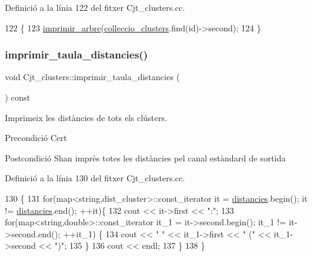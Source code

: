 Definició a la línia 122 del fitxer Cjt\+\_\+clusters.\+cc.


\begin{DoxyCode}
122                                                           \{
123     \hyperlink{_cjt__clusters_8cc_ac7539e7b223cc6042be093b32ac8b016}{imprimir\_arbre}(\hyperlink{class_cjt__clusters_aea7d6362517dd16cbd12736a3da50021}{colleccio\_clusters}.find(\textcolor{keywordtype}{id})->second);
124 \}
\end{DoxyCode}
\mbox{\label{class_cjt__clusters_a2ee45d5dabc656adf8d7d356239f57c6}} 
\subsubsection{\texorpdfstring{imprimir\+\_\+taula\+\_\+distancies()}{imprimir\_taula\_distancies()}}
{\footnotesize\ttfamily void Cjt\+\_\+clusters\+::imprimir\+\_\+taula\+\_\+distancies (\begin{DoxyParamCaption}{ }\end{DoxyParamCaption}) const}



Imprimeix les distàncies de tots els clústers. 

\begin{DoxyPrecond}{Precondició}
Cert 
\end{DoxyPrecond}
\begin{DoxyPostcond}{Postcondició}
S\textquotesingle{}han imprès totes les distàncies pel canal estàndard de sortida 
\end{DoxyPostcond}


Definició a la línia 130 del fitxer Cjt\+\_\+clusters.\+cc.


\begin{DoxyCode}
130                                                   \{
131     \textcolor{keywordflow}{for}(map<string,dist\_cluster>::const\_iterator it = \hyperlink{class_cjt__clusters_a8e94e53830e3224d791dcf7dbd0a6082}{distancies}.begin(); it != 
      \hyperlink{class_cjt__clusters_a8e94e53830e3224d791dcf7dbd0a6082}{distancies}.end(); ++it)\{
132         cout << it->first << \textcolor{stringliteral}{":"};
133         \textcolor{keywordflow}{for}(map<string,double>::const\_iterator it\_1 = it->second.begin(); it\_1 != it->second.end(); ++it\_1)
      \{
134             cout << \textcolor{stringliteral}{" "} << it\_1->first << \textcolor{stringliteral}{" ("} << it\_1->second << \textcolor{stringliteral}{")"};
135         \}
136         cout << endl;
137     \}
138 \}
\end{DoxyCode}
\mbox{\label{class_cjt__clusters_af85ce29152ee18987f391a2d27af59b5}} 
